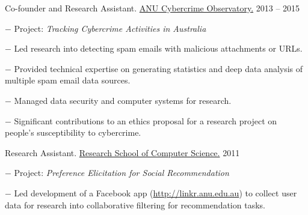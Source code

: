 \documentclass[10pt]{article}
\newcommand{\halfblankline}{\quad\vspace{-0.5\baselineskip}\pagebreak[3]}
\begin{document}
\begin{outerlist}
	\item Co-founder and Research Assistant. \href{http://sociology.cass.anu.edu.au/centres/anu-cybercrime}{ANU Cybercrime Observatory.} \hfill {2013 -- 2015}
	\begin{innerlist}
		\item[$-$] Project: \textit{Tracking Cybercrime Activities in Australia}
		\item[$-$] Led research into detecting spam emails with malicious attachments or URLs.
		\item[$-$] Provided technical expertise on generating statistics and deep data analysis of multiple spam email data sources.
		\item[$-$] Managed data security and computer systems for research.
		\item[$-$] Significant contributions to an ethics proposal for a research project on people's susceptibility to cybercrime.
    \end{innerlist}
	
	\halfblankline
	
	\item Research Assistant. \href{http://cs.anu.edu.au/}{Research School of Computer Science.} \hfill {2011}
	\begin{innerlist}
		\item[$-$] Project: \textit{Preference Elicitation for Social Recommendation}
		\item[$-$] Led development of a Facebook app (\href{http://linkr.anu.edu.au}{http://linkr.anu.edu.au}) to collect user data for research into collaborative filtering for recommendation tasks.
	\end{innerlist}
\end{outerlist}
\end{document}
